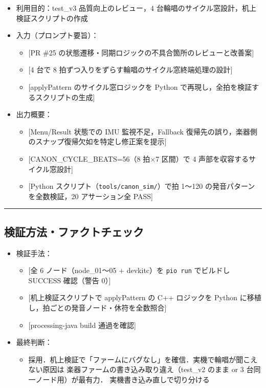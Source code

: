 \documentclass[uplatex,dvipdfmx,a4paper,11pt]{jsarticle}
\newcommand{\sectionrule}{\par\medskip\noindent\rule{\linewidth}{0.6pt}\par\medskip}
\begin{document}
\begin{itemize}
  \item 利用目的：test\_v3 品質向上のレビュー，4 台輪唱のサイクル窓設計，机上検証スクリプトの作成
  \item 入力（プロンプト要旨）：
    \begin{itemize}
      \item {}[PR \#25 の状態遷移・同期ロジックの不具合箇所のレビューと改善案]
      \item {}[4 台で 8 拍ずつ入りをずらす輪唱のサイクル窓終端処理の設計]
      \item {}[applyPattern のサイクル窓ロジックを Python で再現し，全拍を検証するスクリプトの生成]
    \end{itemize}
  \item 出力概要：
    \begin{itemize}
      \item {}[Menu/Result 状態での IMU 監視不足，Fallback 復帰先の誤り，楽器側のスナップ復帰欠如を特定し修正案を提示]
      \item {}[CANON\_CYCLE\_BEATS=56（8 拍$\times$7 区間）で 4 声部を収容するサイクル窓設計]
      \item {}[Python スクリプト（\texttt{tools/canon\_sim/}）で拍 1〜120 の発音パターンを全数検証，20 アサーション全 PASS]
    \end{itemize}
\end{itemize}

\sectionrule

\subsection{検証方法・ファクトチェック}

\begin{itemize}
  \item 検証手法：
    \begin{itemize}
      \item {}[全 6 ノード（node\_01〜05 + devkitc）を \texttt{pio run} でビルドし SUCCESS 確認（警告 0）]
      \item {}[机上検証スクリプトで applyPattern の C++ ロジックを Python に移植し，拍ごとの発音ノード・休符を全数照合]
      \item {}[processing-java build 通過を確認]
    \end{itemize}
  \item 最終判断：
    \begin{itemize}
      \item 採用．机上検証で「ファームにバグなし」を確信．実機で輪唱が聞こえない原因は
            楽器ファームの書き込み取り違え（test\_v2 のまま or 3 台同一ノード用）が最有力．
            実機書き込み直しで切り分ける
    \end{itemize}
\end{itemize}
\end{document}
